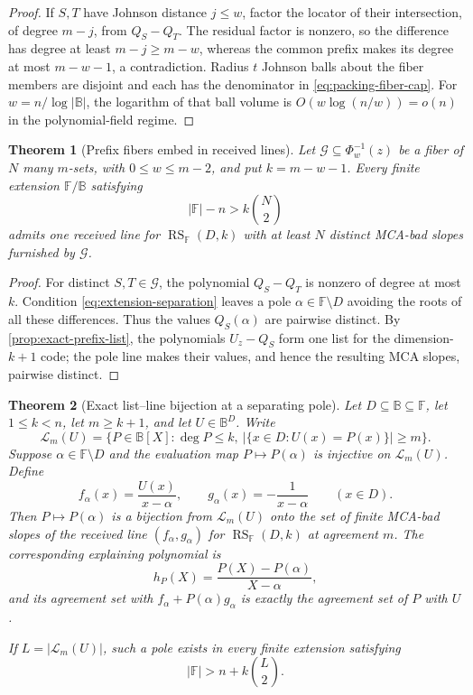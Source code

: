 \documentclass[11pt,a4paper]{amsart}
\numberwithin{equation}{section}
\newtheorem{theorem}{Theorem}[section]
\theoremstyle{remark}
\DeclareMathOperator{\RS}{RS}
\newcommand{\F}{\mathbb F}
\newcommand{\B}{\mathbb B}
\newcommand{\Lcal}{\mathcal L}
\newcommand{\abs}[1]{\lvert #1\rvert}
\begin{document}
\begin{proof}
If \(S,T\) have Johnson distance \(j\le w\), factor the locator of their
intersection, of degree \(m-j\), from \(Q_S-Q_T\).  The residual factor is
nonzero, so the difference has degree at least \(m-j\ge m-w\), whereas the
common prefix makes its degree at most \(m-w-1\), a contradiction.  Radius
\(t\) Johnson balls about the fiber members are disjoint and each has the
denominator in \eqref{eq:packing-fiber-cap}.  For
\(w=n/\log\abs\B\), the logarithm of that ball volume is
\(O(w\log(n/w))=o(n)\) in the polynomial-field regime.
\end{proof}

\begin{theorem}[Prefix fibers embed in received lines]
\label{thm:prefix-to-line-hardness}
Let \(\mathcal G\subseteq\Phi_w^{-1}(z)\) be a fiber of \(N\) many
\(m\)-sets, with \(0\le w\le m-2\), and put \(k=m-w-1\).  Every finite
extension \(\F/\B\) satisfying
\[
        \abs\F-n>k\binom N2
        \tag{4.5}\label{eq:extension-separation}
\]
admits one received line for \(\RS_\F(D,k)\) with at least \(N\) distinct
MCA-bad slopes furnished by \(\mathcal G\).
\end{theorem}

\begin{proof}
For distinct \(S,T\in\mathcal G\), the polynomial \(Q_S-Q_T\) is nonzero
of degree at most \(k\).  Condition \eqref{eq:extension-separation} leaves a
pole \(\alpha\in\F\setminus D\) avoiding the roots of all these
differences.  Thus the values \(Q_S(\alpha)\) are pairwise distinct.  By
\cref{prop:exact-prefix-list}, the polynomials \(U_z-Q_S\) form one list for
the dimension-\(k+1\) code; the pole line makes their values, and hence the
resulting MCA slopes, pairwise distinct.
\end{proof}

\begin{theorem}[Exact list--line bijection at a separating pole]
\label{thm:exact-list-line-bijection}
Let \(D\subseteq\B\subseteq\F\), let \(1\le k<n\), let \(m\ge k+1\),
and let \(U\in\B^D\).  Write
\[
 \Lcal_m(U)=\{P\in\B[X]:\deg P\le k,
       \ \abs{\{x\in D:U(x)=P(x)\}}\ge m\}.
\]
Suppose \(\alpha\in\F\setminus D\) and the evaluation map
\(P\mapsto P(\alpha)\) is injective on \(\Lcal_m(U)\).  Define
\[
 f_\alpha(x)=\frac{U(x)}{x-\alpha},\qquad
 g_\alpha(x)=-\frac1{x-\alpha}\qquad(x\in D).
\]
Then \(P\mapsto P(\alpha)\) is a bijection from \(\Lcal_m(U)\) onto
the set of finite MCA-bad slopes of the received line
\((f_\alpha,g_\alpha)\) for \(\RS_\F(D,k)\) at agreement \(m\).  The
corresponding explaining polynomial is
\[
       h_P(X)=\frac{P(X)-P(\alpha)}{X-\alpha},
\]
and its agreement set with
\(f_\alpha+P(\alpha)g_\alpha\) is exactly the agreement set of \(P\)
with \(U\).

If \(L=\abs{\Lcal_m(U)}\), such a pole exists in every finite extension
satisfying
\[
       \abs\F>n+k\binom L2.                         \tag{4.6}
\]
\end{theorem}
\end{document}
